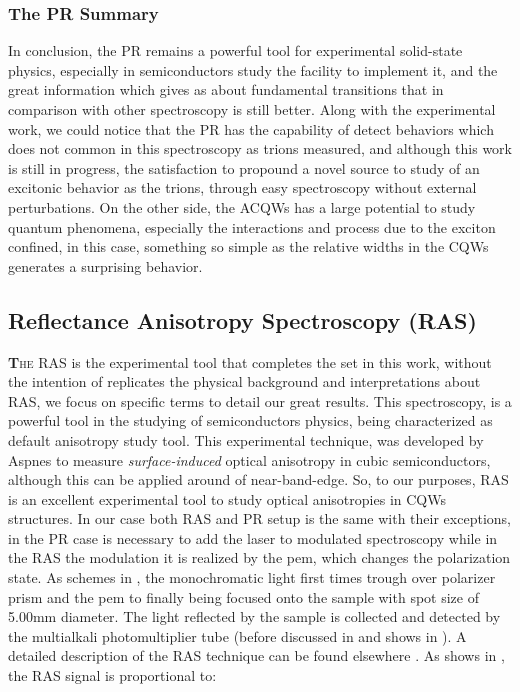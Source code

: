  \subsubsection{The PR Summary}
 \label{subsubsec:chapter-3-ps-conclusions}
 \vspace{-10mm}
 In conclusion, the PR remains a powerful tool for experimental solid-state physics, especially in semiconductors study the facility to implement it, and the great information which gives as about fundamental transitions that in comparison with other spectroscopy is still better. Along with the experimental work, we could notice that the PR has the capability of detect behaviors which does not common in this spectroscopy as trions measured, and although this work is still in progress, the satisfaction to propound a novel source to study of an excitonic behavior as the trions,  through easy spectroscopy without external perturbations.  On the other side, the \gls{ACQWs} has a large potential to study quantum phenomena, especially the interactions and process due to the exciton confined, in this case, something so simple as the relative widths in the \gls{CQWs} generates a surprising behavior. 



\subsection{Reflectance Anisotropy Spectroscopy (RAS)}
\label{subsec:chapter-3-ras}
 \vspace{-10mm}
\lettrine[lines=3, lraise=.1, nindent=0mm, slope=0mm]{\textbf{T}}{he \gls{RAS}} is the experimental tool that completes the set in this work, without the intention of replicates the physical background and interpretations about RAS, we focus on specific terms to detail our great results.  This spectroscopy, is a  powerful tool in the studying of semiconductors physics, being characterized as default anisotropy study tool.  This experimental technique, was developed by Aspnes\cite{aspnes1973surface,aspnes1985anisotropies, aspnes1985above} to measure \emph{surface-induced} optical anisotropy in cubic semiconductors, although this can be applied around of near-band-edge\cite{wei1995theory}. So, to our purposes, \gls{RAS} is an excellent experimental tool to study optical anisotropies in CQWs structures. In our case both \gls{RAS} and \gls{PR} setup is the same with their exceptions, in the \gls{PR} case is necessary to add the laser to modulated spectroscopy while in the \gls{RAS} the modulation it is realized by the \gls{pem}, which changes the polarization state. As schemes in , the monochromatic light first times trough over polarizer prism and the \gls{pem} to finally being focused onto the sample with spot size of 5.00mm diameter. The light reflected by the sample is collected and detected by the multialkali photomultiplier tube (before discussed in  and shows in ). A detailed description of the RAS technique can be found elsewhere \cite{lflm1993spectrometer}. As shows in , the RAS signal is proportional to: 

